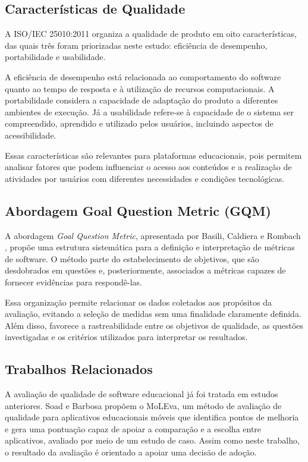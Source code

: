\documentclass[sigconf, language=english, language=brazilian,natbib=false]{acmart}
\begin{document}
\subsection{Características de Qualidade}

A ISO/IEC 25010:2011 \cite{iso25010} organiza a qualidade de produto em oito características, das quais três foram priorizadas neste estudo: eficiência de desempenho, portabilidade e usabilidade.

A eficiência de desempenho está relacionada ao comportamento do software quanto ao tempo de resposta e à utilização de recursos computacionais. A portabilidade considera a capacidade de adaptação do produto a diferentes ambientes de execução. Já a usabilidade refere-se à capacidade de o sistema ser compreendido, aprendido e utilizado pelos usuários, incluindo aspectos de acessibilidade.

Essas características são relevantes para plataformas educacionais, pois permitem analisar fatores que podem influenciar o acesso aos conteúdos e a realização de atividades por usuários com diferentes necessidades e condições tecnológicas.

\subsection{Abordagem Goal Question Metric (GQM)}

A abordagem \textit{Goal Question Metric}, apresentada por Basili, Caldiera e Rombach \cite{basili1994goal}, propõe uma estrutura sistemática para a definição e interpretação de métricas de software. O método parte do estabelecimento de objetivos, que são desdobrados em questões e, posteriormente, associados a métricas capazes de fornecer evidências para respondê-las.

Essa organização permite relacionar os dados coletados aos propósitos da avaliação, evitando a seleção de medidas sem uma finalidade claramente definida. Além disso, favorece a rastreabilidade entre os objetivos de qualidade, as questões investigadas e os critérios utilizados para interpretar os resultados.

\subsection{Trabalhos Relacionados}

A avaliação de qualidade de software educacional já foi tratada em estudos anteriores. Soad e Barbosa \cite{soad2017moleva} propõem o MoLEva, um método de avaliação de qualidade para aplicativos educacionais móveis que identifica pontos de melhoria e gera uma pontuação capaz de apoiar a comparação e a escolha entre aplicativos, avaliado por meio de um estudo de caso. Assim como neste trabalho, o resultado da avaliação é orientado a apoiar uma decisão de adoção.
\end{document}
